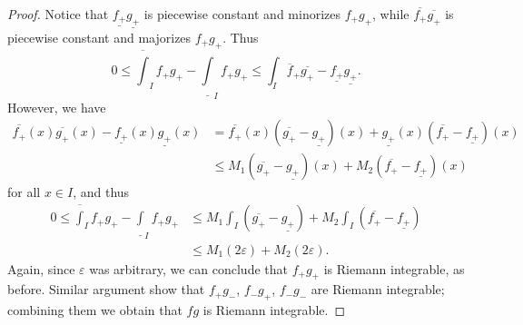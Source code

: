 \begin{proof}
    Notice that \(\underline{f_+} \underline{g_+}\) is piecewise constant and minorizes \(f_+ g_+\), while \(\overline{f_+} \overline{g_+}\) is piecewise constant and majorizes \(f_+ g_+\).
    Thus
    \[
        0 \leq \overline{\int}_I f_+ g_+ - \underline{\int}_I f_+ g_+ \leq \int_I \overline{f}_+ \overline{g_+} - \underline{f_+} \underline{g_+}.
    \]
    However, we have
    \begin{align*}
        \overline{f_+}(x) \overline{g_+}(x) - \underline{f_+}(x) \underline{g_+}(x) & = \overline{f_+}(x) (\overline{g_+} - \underline{g_+})(x) + \underline{g_+}(x) (\overline{f_+} - \underline{f_+})(x) \\
                                                                                    & \leq M_1 (\overline{g_+} - \underline{g_+})(x) + M_2 (\overline{f_+} - \underline{f_+})(x)
    \end{align*}
    for all \(x \in I\), and thus
    \begin{align*}
        0 \leq \overline{\int}_I f_+ g_+ - \underline{\int}_I f_+ g_+ & \leq M_1 \int_I (\overline{g_+} - \underline{g_+}) + M_2 \int_I (\overline{f_+} - \underline{f_+}) \\
                                                                      & \leq M_1 (2\varepsilon) + M_2 (2\varepsilon).
    \end{align*}
    Again, since \(\varepsilon\) was arbitrary, we can conclude that \(f_+ g_+\) is Riemann integrable, as before.
    Similar argument show that \(f_+ g_-\), \(f_- g_+\), \(f_- g_-\) are Riemann integrable;
    combining them we obtain that \(fg\) is Riemann integrable.
\end{proof}